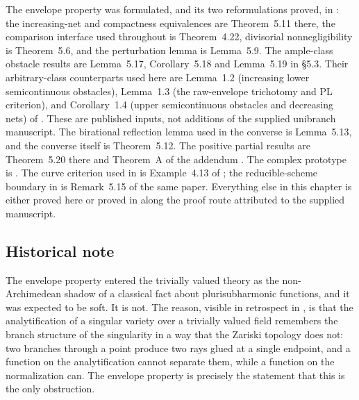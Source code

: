 The envelope property was formulated, and its two reformulations proved, in
\cite[\S5]{BJ22}: the increasing-net and compactness equivalences are
Theorem~5.11 there, the comparison interface used throughout is
Theorem~4.22, divisorial nonnegligibility is Theorem~5.6, and the
perturbation lemma is Lemma~5.9.  The ample-class obstacle results are
Lemma~5.17, Corollary~5.18 and Lemma~5.19 in \S5.3.
Their arbitrary-class counterparts used here are
Lemma~1.2 (increasing lower semicontinuous obstacles),
Lemma~1.3 (the raw-envelope trichotomy and PL criterion), and
Corollary~1.4 (upper semicontinuous obstacles and decreasing nets) of
\cite{BJ22b}.  These are published inputs, not additions of the supplied
unibranch manuscript.  The birational reflection lemma used in the
converse is Lemma~5.13, and the converse itself is Theorem~5.12.  The
positive partial results are Theorem~5.20 there and Theorem~A of the
addendum \cite{BJ22b}.  The complex prototype is \cite{BT82}.  The curve
criterion used in  is Example~4.13 of
\cite{BJ22}; the reducible-scheme boundary in
 is Remark~5.15 of the same paper.
Everything else in this chapter is either proved here or
proved in
along the proof route attributed to the supplied manuscript.

\subsection{Historical note}
\label{sec:ch45-history-note}

The envelope property entered the trivially valued theory as the
non-Archimedean shadow of a classical fact about plurisubharmonic functions,
and it was expected to be soft.  It is not.  The reason, visible in
retrospect in , is that the analytification
of a singular variety over a trivially valued field remembers the branch
structure of the singularity in a way that the Zariski topology does not: two
branches through a point produce two rays glued at a single endpoint, and a
function on the analytification cannot separate them, while a function on
the normalization can.  The envelope property is precisely the statement
that this is the only obstruction.

